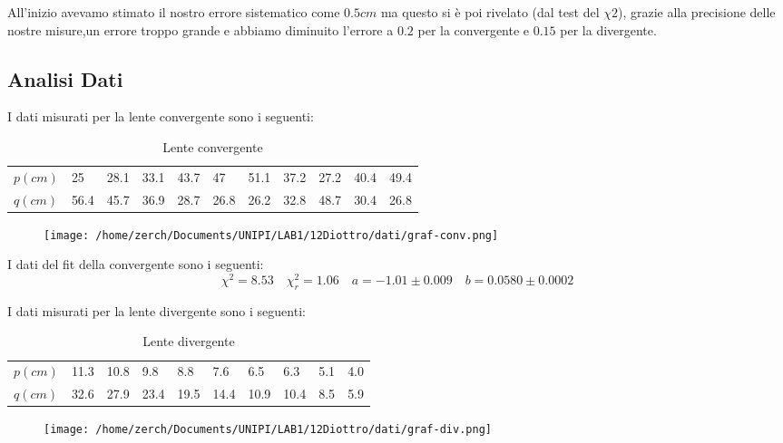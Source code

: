 \documentclass[a4paper,10pt]{article}
\begin{document}
All'inizio avevamo stimato il nostro errore sistematico come $0.5cm$ ma questo si è poi rivelato (dal test del $\chi2$), grazie alla precisione delle nostre misure,un errore troppo grande e abbiamo diminuito l'errore a $0.2$ per la convergente e $0.15$ per la divergente.

\subsection{Analisi Dati}
I dati misurati per la lente convergente  sono i seguenti:

\begin{table}[!htb]
\centering
\caption{Lente convergente}
\label{my-label}
\begin{tabular}{l|llllllllll}
$p(cm)$ & 25   & 28.1 & 33.1 & 43.7 & 47   & 51.1 & 37.2 & 27.2 & 40.4 & 49.4 \\ \cline{1-11} 
$q (cm)$     & 56.4 & 45.7 & 36.9 & 28.7 & 26.8 & 26.2 & 32.8 & 48.7 & 30.4 & 26.8 \\
\end{tabular}
\end{table}
 \begin {figure}[!htb]
\begin{center}
\texttt{[image: /home/zerch/Documents/UNIPI/LAB1/12Diottro/dati/graf-conv.png]}
\end{center}
\end{figure}

I dati del fit della convergente sono i seguenti:
\begin{equation} 
\chi^2=8.53 \quad \chi^2_r=1.06 \quad a=-1.01\pm 0.009 \quad b=0.0580\pm0.0002
\end{equation}


I dati misurati per la lente divergente sono i seguenti:
\pagebreak
\begin{table}[!htb]
\centering
\caption{Lente divergente}
\label{my-label}
\begin{tabular}{l|lllllllll}
$p(cm)$ & 11.3  & 10.8 & 9.8 & 8.8 & 7.6 & 6.5 & 6.3 & 5.1 & 4.0  \\ \cline{1-10} 
$q (cm)$& 32.6 & 27.9 & 23.4 & 19.5 & 14.4 & 10.9 & 10.4 & 8.5 & 5.9 \\ 
\end{tabular}
\end{table}


 \begin {figure}[!htb]
\begin{center}
\texttt{[image: /home/zerch/Documents/UNIPI/LAB1/12Diottro/dati/graf-div.png]}
\end{center}
\end{figure}
\end{document}
